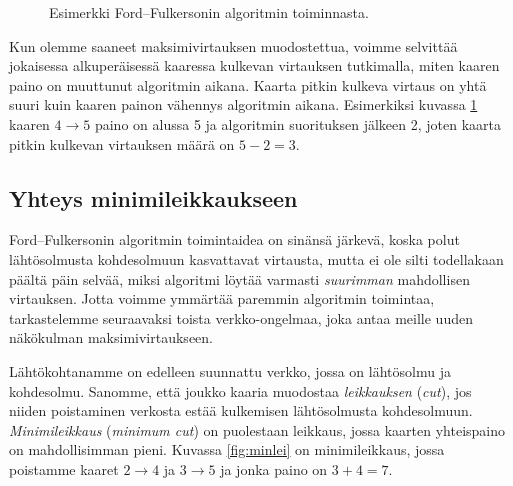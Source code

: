 \begin{figure}
\begin{center}
\end{center}
\caption{Esimerkki Ford–Fulkersonin algoritmin toiminnasta.}
\label{fig:floesi}
\end{figure}

Kun olemme saaneet maksimivirtauksen muodostettua,
voimme selvittää jokaisessa alkuperäisessä kaaressa kulkevan
virtauksen tutkimalla, miten kaaren paino on muuttunut algoritmin aikana.
Kaarta pitkin kulkeva virtaus on yhtä suuri kuin kaaren painon
vähennys algoritmin aikana.
Esimerkiksi kuvassa \ref{fig:floesi} kaaren $4 \rightarrow 5$
paino on alussa 5 ja algoritmin suorituksen jälkeen 2,
joten kaarta pitkin kulkevan virtauksen määrä on $5-2=3$.

\subsection{Yhteys minimileikkaukseen}


Ford–Fulkersonin algoritmin toimintaidea on sinänsä järkevä,
koska polut lähtösolmusta kohdesolmuun kasvattavat virtausta,
mutta ei ole silti todellakaan päältä päin selvää,
miksi algoritmi löytää varmasti \emph{suurimman} mahdollisen virtauksen.
Jotta voimme ymmärtää paremmin algoritmin toimintaa,
tarkastelemme seuraavaksi toista verkko-ongelmaa,
joka antaa meille uuden näkökulman maksimivirtaukseen.

Lähtökohtanamme on edelleen suunnattu verkko,
jossa on lähtösolmu ja kohdesolmu.
Sanomme, että joukko kaaria muodostaa \emph{leikkauksen} (\emph{cut}),
jos niiden poistaminen verkosta estää kulkemisen
lähtösolmusta kohdesolmuun.
\emph{Minimileikkaus} (\emph{minimum cut}) on puolestaan leikkaus,
jossa kaarten yhteispaino on mahdollisimman pieni.
Kuvassa \ref{fig:minlei} on minimileikkaus,
jossa poistamme kaaret $2 \rightarrow 4$ ja $3 \rightarrow 5$
ja jonka paino on $3+4=7$.

